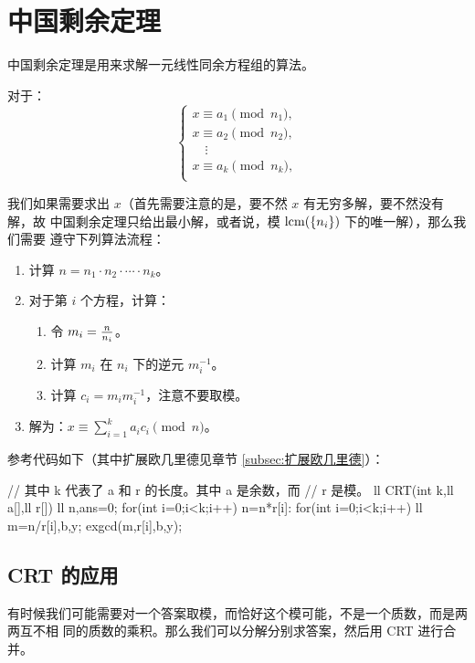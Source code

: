 \section{中国剩余定理} \label{sec:中国剩余定理}

中国剩余定理是用来求解一元线性同余方程组的算法。

对于：
$$\begin{cases}
    x \equiv a_1 \pmod {n_1}, \\
    x \equiv a_2 \pmod {n_2}, \\
    \quad \vdots              \\
    x \equiv a_k \pmod {n_k}, \\
\end{cases}$$

我们如果需要求出 $x$（首先需要注意的是，要不然 $x$ 有无穷多解，要不然没有解，故
中国剩余定理只给出最小解，或者说，模 $\mathrm{lcm}(\{n_i\})$ 下的唯一解），那么我们需要
遵守下列算法流程：
\begin{enumerate}
    \item 计算 $n = n_1 \cdot n_2 \cdot \cdots \cdot n_k$。
    \item 对于第 $i$ 个方程，计算：
        \begin{enumerate}
            \item 令 $m_i = {n \over n_i}$。
            \item 计算 $m_i$ 在 $n_i$ 下的逆元 $m_i ^ {-1}$。
            \item 计算 $c_i = m_i m_i^{-1}$，注意不要取模。
        \end{enumerate}
    \item 解为：$x \equiv \sum_{i=1}^k a_i c_i \pmod n$。
\end{enumerate}

参考代码如下（其中扩展欧几里德见章节 \ref{subsec:扩展欧几里德}）：
\begin{Cpp}
// 其中 k 代表了 a 和 r 的长度。其中 a 是余数，而
// r 是模。
ll CRT(int k,ll a[],ll r[]){
  ll n,ans=0;
  for(int i=0;i<k;i++) n=n*r[i]:
  for(int i=0;i<k;i++) {
    ll m=n/r[i],b,y;
    exgcd(m,r[i],b,y);
  }
}
\end{Cpp}

\subsection{CRT 的应用}
有时候我们可能需要对一个答案取模，而恰好这个模可能，不是一个质数，而是两两互不相
同的质数的乘积。那么我们可以分解分别求答案，然后用 CRT 进行合并。

